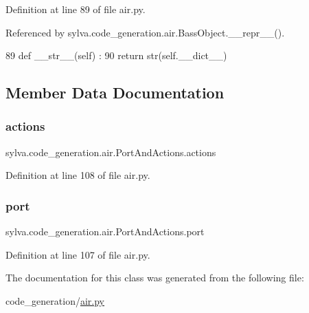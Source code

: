 Definition at line 89 of file air.\+py.



Referenced by sylva.\+code\+\_\+generation.\+air.\+Bass\+Object.\+\_\+\+\_\+repr\+\_\+\+\_\+().


\begin{DoxyCode}
89   \textcolor{keyword}{def }\_\_str\_\_(self) :
90     \textcolor{keywordflow}{return} str(self.\_\_dict\_\_)
\end{DoxyCode}


\subsection{Member Data Documentation}
\mbox{\label{classsylva_1_1code__generation_1_1air_1_1_port_and_actions_aaeb765c205fcb8c38025428542025ba7}} 
\subsubsection{\texorpdfstring{actions}{actions}}
{\footnotesize\ttfamily sylva.\+code\+\_\+generation.\+air.\+Port\+And\+Actions.\+actions}



Definition at line 108 of file air.\+py.

\mbox{\label{classsylva_1_1code__generation_1_1air_1_1_port_and_actions_a6b5a21780c1b3cc8879c05a5dfdd65bf}} 
\subsubsection{\texorpdfstring{port}{port}}
{\footnotesize\ttfamily sylva.\+code\+\_\+generation.\+air.\+Port\+And\+Actions.\+port}



Definition at line 107 of file air.\+py.



The documentation for this class was generated from the following file\+:\begin{DoxyCompactItemize}
\item 
code\+\_\+generation/\hyperlink{air_8py}{air.\+py}\end{DoxyCompactItemize}
